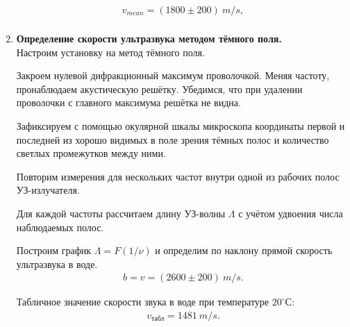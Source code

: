 \begin{enumerate}
    \begin{gather*}
        v_{mean} = (1800 \pm 200)~m / s,\\
    \end{gather*}
    
    
    \item 

    \textbf{Определение скорости ультразвука методом тёмного поля.}\\
    
    Настроим установку на метод тёмного поля.
    
    Закроем нулевой дифракционный максимум проволочкой. Меняя частоту, пронаблюдаем акустическую решётку. Убедимся, что при удалении проволочки с главного максимума решётка не видна.
    
    Зафиксируем с помощью окулярной шкалы микроскопа координаты первой и последней из хорошо видимых в поле зрения тёмных полос и количество светлых промежутков между ними.
    
    Повторим измерения для нескольких частот внутри одной из рабочих полос УЗ-излучателя.
    
    \begin{figure}[h]
    \end{figure}
    
    Для каждой частоты рассчитаем длину УЗ-волны $\Lambda$ с учётом удвоения числа наблюдаемых полос.
    
    Построим график $\Lambda = F(1/\nu)$ и определим по наклону прямой скорость ультразвука в воде.
    \begin{gather*}
        b = v = (2600 \pm 200)~m / s.
    \end{gather*}
    
    Табличное значение скорости звука в воде при температуре $20^{\circ}С$:
    \begin{gather*}
        v_{\text{табл}} = 1481~m / s.
    \end{gather*}

\end{enumerate}


